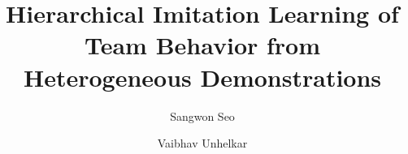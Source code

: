 





\title[Hierarchical Imitation Learning of Team Behavior from Heterogeneous Demonstrations]{Hierarchical Imitation Learning of Team Behavior from Heterogeneous Demonstrations}


\author{Sangwon Seo}


\author{Vaibhav Unhelkar}

